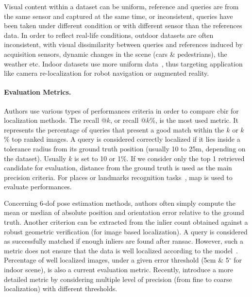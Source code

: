 		Visual content within a dataset can be uniform, reference and queries are from the same sensor and captured at the same time, or inconsistent, queries have been taken under different condition or with different sensor than the references data. In order to reflect real-life conditions, outdoor datasets are often inconsistent, with visual dissimilarity between queries and references induced by acquisition sensors, dynamic changes in the scene (cars \& pedestrians),  the weather etc. Indoor datasets use more uniform data~\citep{Shotton2013}, thus targeting application like camera re-localization for robot navigation or augmented reality.

		\paragraph{Evaluation Metrics.}
		\label{subsec:evaluation_metric}
			Authors use various types of performances criteria in order to compare \ac{cbir} for localization methods. The recall @$k$, or recall @$k$\%, is the most used metric. It represents the percentage of queries that present a good match within the $k$ or $k$\% top ranked images. A query is considered correctly localized if it lies inside a tolerance radius from its ground truth position (usually 10 to 25m, depending on the dataset).  Usually $k$ is set to 10 or 1\%. If we consider only the top 1 retrieved candidate for evaluation, distance from the ground truth is used as the main precision criteria. For places or landmarks recognition tasks~\citep{Radenovic2018}, \ac{map} is used to evaluate performances.
			
			Concerning 6-\ac{dof} pose estimation methods, authors often simply compute the mean or median of absolute position and orientation error relative to the ground truth. Another criterion can be extracted from the inlier count obtained against a robust geometric verification (for image based localization). A query is considered as successfully matched if enough inliers are found after \ac{ransac}. However, such a metric does not ensure that the data is well localized according to the model~\citep{Sattler2015}. Percentage of well localized images, \ie under a given error threshold (5cm \& 5$^{\circ}$ for indoor scene), is also a current evaluation metric.  Recently, \citet{Sattler2018} introduce a more detailed metric by considering multiple level of precision (from fine to coarse localization) with different thresholds.
			
	 

